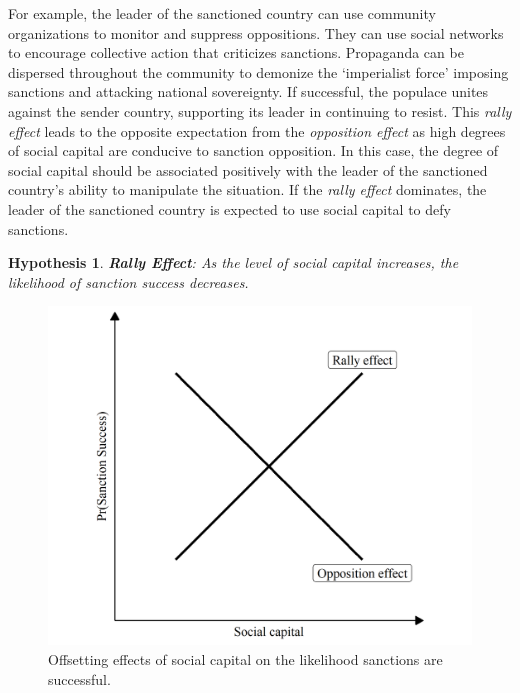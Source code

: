 \documentclass[12pt,]{article}
\newtheorem{hyp}{Hypothesis}
\begin{document}
For example, the leader of the sanctioned country can use community
organizations to monitor and suppress oppositions. They can use social
networks to encourage collective action that criticizes sanctions.
Propaganda can be dispersed throughout the community to demonize the
`imperialist force' imposing sanctions and attacking national
sovereignty. If successful, the populace unites against the sender
country, supporting its leader in continuing to resist. This \emph{rally
effect} leads to the opposite expectation from the \emph{opposition
effect} as high degrees of social capital are conducive to sanction
opposition. In this case, the degree of social capital should be
associated positively with the leader of the sanctioned country's
ability to manipulate the situation. If the \emph{rally effect}
dominates, the leader of the sanctioned country is expected to use
social capital to defy sanctions. \newline

\begin{hyp}\label{rally} {\bf Rally Effect}: As the level of social capital increases, the likelihood of sanction success decreases.\end{hyp}

\begin{figure}

{\centering \includegraphics[width=0.65\linewidth]{figures/equilibrium} 

}

\caption{\label{fig1} Offsetting effects of social capital on the likelihood sanctions are successful.}\label{fig:unnamed-chunk-1}
\end{figure}
\end{document}
